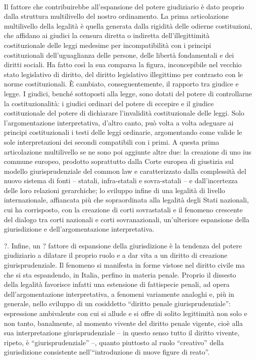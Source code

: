 \\Il fattore che contribuirebbe all'espansione del potere giudiziario è dato proprio dalla struttura multilivello del nostro ordinamento.
La prima articolazione multilivello della legalità è quella generata dalla rigidità delle odierne costituzioni, che affidano ai giudici la censura diretta o indiretta dell’illegittimità costituzionale delle leggi medesime per incompatibilità con i principi costituzionali dell’uguaglianza delle persone, delle libertà fondamentali e dei diritti sociali. Ha fatto così la sua comparsa la figura, inconcepibile nel vecchio stato legislativo di diritto, del diritto legislativo illegittimo per contrasto con le norme costituzionali. È cambiato, conseguentemente, il rapporto tra giudice e legge. I giudici, benché sottoposti alla legge, sono dotati del potere di controllarne la costituzionalità: i giudici ordinari del potere di eccepire e il giudice costituzionale del potere di dichiarare l’invalidità costituzionale delle leggi. Solo l’argomentazione interpretativa, d’altro canto, può volta a volta adeguare ai principi costituzionali i testi delle leggi ordinarie, argomentando come valide le sole interpretazioni dei secondi compatibili con i primi. A questa prima articolazione multilivello se ne sono poi aggiunte altre due: la creazione di uno ius commune europeo, prodotto soprattutto dalla Corte europea di giustizia sul modello giurisprudenziale del common law e caratterizzato dalla complessità del nuovo sistema di fonti – statali, infra-statali e sovra-statali – e dall’incertezza delle loro relazioni gerarchiche; lo sviluppo infine di una legalità di livello internazionale, affiancata più che sopraordinata alla legalità degli Stati nazionali, cui ha corrisposto, con la creazione di corti sovrastatali e il fenomeno crescente del dialogo tra corti nazionali e corti sovranazionali, un’ulteriore espansione della giurisdizione e dell’argomentazione interpretativa.

?. Infine, un ? fattore di espansione della giurisdizione è la tendenza del potere giudiziario a dilatare il proprio ruolo e a dar vita a un diritto di creazione giurisprudenziale. Il fenomeno si manifesta in forme vistose nel diritto civile ma che si sta espandendo, in Italia, perfino in materia penale. Proprio il dissesto della legalità favorisce infatti una estensione di fattispecie penali, ad opera dell’argomentazione interpretativa, a fenomeni variamente analoghi e, più in generale, nello sviluppo di un cosiddetto “diritto penale giurisprudenziale”: espressione ambivalente con cui si allude e si offre di solito legittimità non solo e non tanto, banalmente, al momento vivente del diritto penale vigente, cioè alla sua interpretazione giurisprudenziale – in questo senso tutto il diritto vivente, ripeto, è “giurisprudenziale” –, quanto piuttosto al ruolo “creativo” della giurisdizione consistente nell’“introduzione di nuove figure di reato”.

